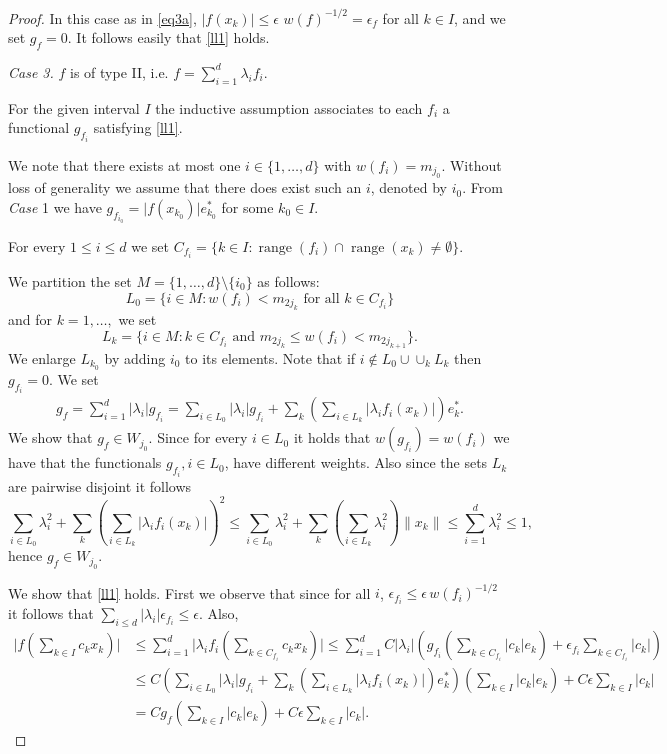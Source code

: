 \documentclass[a4paper]{amsart}
\theoremstyle{plain}
\newcommand{\e}{\epsilon}
\newcommand{\norm}[1][\cdot]{\lVert #1\rVert}
\DeclareMathOperator{\ran}{range}
\begin{document}
\begin{proof}
In this case  as in \eqref{eq3a}, $\vert f(x_k)\vert \leq
\e\,\,w(f)^{-1/2}=\e_{f}$ for all $k\in I$, and  we set $g_{f}=0$.
It follows easily that  \eqref{ll1} holds.


\smallskip


\textit{Case 3.} $f$ is of type II, i.e. $f=\sum_{i=1}^{d}\lambda_{i}f_{i}$.

For the given interval $I$  the inductive assumption associates to each $f_{i}$ a functional $g_{f_{i}}$ satisfying
\eqref{ll1}.


We note that  there exists at most one $i\in\{1,\dots,d\}$ with $w(f_i)=m_{j_0}$. Without
loss of generality we assume that there does exist such an $i$, denoted by $i_0$. From
\textit{Case} 1 we have $g_{f_{i_0}}=\vert f(x_{k_0})\vert e^{*}_{k_0}$ for some  $k_0\in
I$.

For every $1\leq i \leq d$ we set
 $C_{f_i}=\{k\in I: \ran(f_{i})\cap\ran(x_k)\ne\emptyset\}$.

We partition the set $M=\{1,\dots,d\}\setminus\{i_0\}$ as follows:
$$
L_{0}=\{i\in M: w(f_{i})<m_{2j_{k}}\,\,\text{for all $k\in C_{f_i}$}\}
$$
and for $k=1,\dots,$ we set
$$
\mbox{$L_{k}=\{i\in M: k\in C_{f_{i}}\,\,\text{and}\,\,
m_{2j_{k}}\leq w(f_i)<m_{2j_{k+1}}\}$}.
$$
We enlarge $L_{k_0}$ by adding  $i_0$ to its elements.
Note that if $i\not\in L_{0}\cup\cup_{k}L_{k}$ then  $g_{f_i}=0$.
We set
\begin{align*}
g_{f}=\sum_{i=1}^{d}\vert \lambda_{i}\vert g_{f_i}= \sum_{i\in
L_0}\vert \lambda_{i}\vert g_{f_i} +\sum_{k}(\sum_{i\in
L_{k}}\vert\lambda_{i}f_{i}(x_k)\vert)e_{k}^{*}.
 \end{align*}
We show that $g_{f}\in W_{j_0}$. Since for every $i\in L_{0}$ it holds  that
$w(g_{f_i})=w(f_{i})$ we have that the functionals $g_{f_i}, i\in L_{0}$, have different
weights. Also since the sets  $L_{k}$ are pairwise disjoint it follows
$$
\sum_{i\in L_0}\lambda_{i}^{2}+
\sum_{k}(\sum_{i\in L_{k}}\vert\lambda_{i}f_{i}(x_k)\vert)^2\leq
\sum_{i\in L_0}\lambda_{i}^{2}+
\sum_{k}(\sum_{i\in L_{k}}\lambda_{i}^2)\norm[x_k]\leq
\sum_{i=1}^{d}\lambda_{i}^{2}\leq 1,
$$
hence $g_{f}\in W_{j_0}$.


We show that  \eqref{ll1} holds.  First we observe that since for all $i$, $\e_{f_{i}}\leq\e\,w(f_{i})^{-1/2}$ it follows that
$
\sum_{i\leq d}\vert\lambda_{i}\vert \e_{f_{i}}\leq \e.
$
Also,
\begin{align*}
\vert f(\sum_{k\in I}c_{k}x_{k})\vert
& \leq
\sum_{i=1}^{d}\vert\lambda_{i}f_{i}(\sum_{k\in C_{f_i}}c_{k}x_{k})\vert
\leq \sum_{i=1}^{d}C\vert\lambda_{i}\vert
(g_{f_i}(\sum_{k\in C_{f_i}}\vert c_{k}\vert e_{k}) +
\e_{f_{i}}\sum_{k\in C_{f_i}}\vert c_{k}\vert)
\\
&\leq C\left(\sum_{i\in L_0}\vert\lambda_{i}\vert g_{f_i}+
\sum_{k}(\sum_{i\in L_{k}}\vert\lambda_{i}f_{i}(x_k)\vert)
e_{k}^{*}\right) \left(\sum_{k\in I}\vert c_k\vert e_{k}\right)
+C\e\sum_{k\in I}\vert c_k\vert
\\
&=Cg_{f}(\sum_{k\in I}\vert c_k\vert e_{k}) +C\e\sum_{k\in I}\vert c_k\vert.
\end{align*}






\end{proof}
\end{document}
